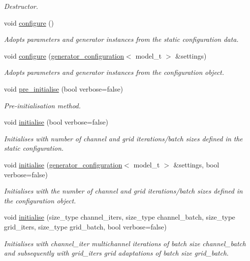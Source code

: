 \begin{DoxyCompactItemize}
\begin{DoxyCompactList}\small\item\em Destructor. \end{DoxyCompactList}\item 
void \hyperlink{a00430_ace17ed07b709fdf64286c526a05426d2}{configure} ()
\begin{DoxyCompactList}\small\item\em Adopts parameters and generator instances from the static configuration data. \end{DoxyCompactList}\item 
void \hyperlink{a00430_a6cdab69301ae7612d1e7fc4cdcde1e45}{configure} (\hyperlink{a00237}{generator\-\_\-configuration}$<$ model\-\_\-t $>$ \&settings)
\begin{DoxyCompactList}\small\item\em Adopts parameters and generator instances from the configuration object. \end{DoxyCompactList}\item 
void \hyperlink{a00430_aae0815b663b8bf925ffe1db79e051c3d}{pre\-\_\-initialise} (bool verbose=false)
\begin{DoxyCompactList}\small\item\em Pre-\/initialisation method. \end{DoxyCompactList}\item 
void \hyperlink{a00430_a86ddd9452bb07c7e095cb4825730c0e6}{initialise} (bool verbose=false)
\begin{DoxyCompactList}\small\item\em Initialises with number of channel and grid iterations/batch sizes defined in the static configuration. \end{DoxyCompactList}\item 
void \hyperlink{a00430_a36cf52b8681e8654fe557cec7516cb9f}{initialise} (\hyperlink{a00237}{generator\-\_\-configuration}$<$ model\-\_\-t $>$ \&settings, bool verbose=false)
\begin{DoxyCompactList}\small\item\em Initialises with the number of channel and grid iterations/batch sizes defined in the configuration object. \end{DoxyCompactList}\item 
void \hyperlink{a00430_aff4d3947c4310438a4e8e6381f443cab}{initialise} (size\-\_\-type channel\-\_\-iters, size\-\_\-type channel\-\_\-batch, size\-\_\-type grid\-\_\-iters, size\-\_\-type grid\-\_\-batch, bool verbose=false)
\begin{DoxyCompactList}\small\item\em Initialises with channel\-\_\-iter multichannel iterations of batch size channel\-\_\-batch and subsequently with grid\-\_\-iters grid adaptations of batch size grid\-\_\-batch. \end{DoxyCompactList}\item 

\end{DoxyCompactItemize}
